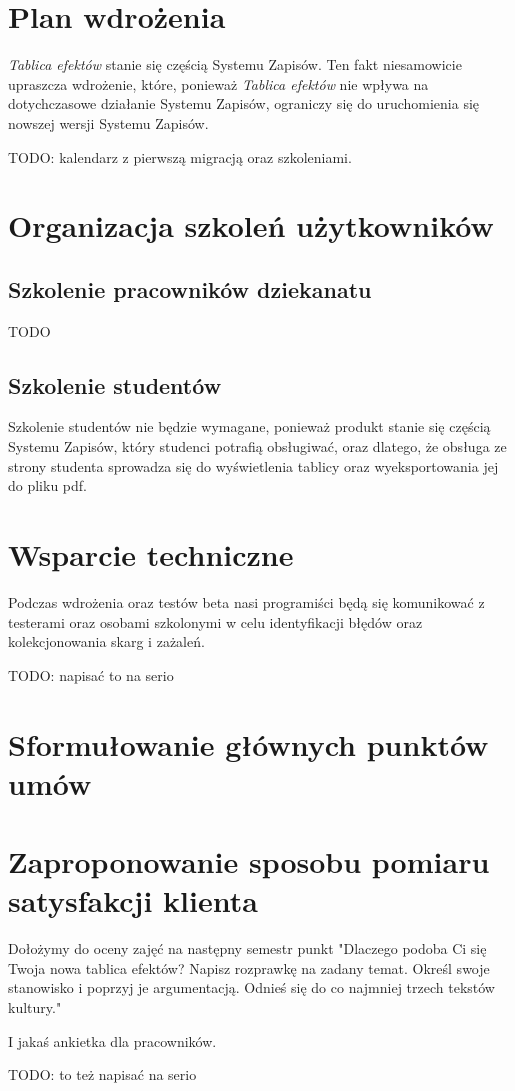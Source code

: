 \documentclass{article}
\begin{document}
\section{Plan wdrożenia}
\textit{Tablica efektów} stanie się częścią Systemu Zapisów.
Ten fakt niesamowicie upraszcza wdrożenie, które, ponieważ \textit{Tablica efektów} nie wpływa na dotychczasowe działanie Systemu Zapisów, ograniczy się do uruchomienia się nowszej wersji Systemu Zapisów.

TODO: kalendarz z pierwszą migracją oraz szkoleniami.

\section{Organizacja szkoleń użytkowników}

\subsection{Szkolenie pracowników dziekanatu}
TODO

\subsection{Szkolenie studentów}
Szkolenie studentów nie będzie wymagane, ponieważ produkt stanie się częścią Systemu Zapisów, który studenci potrafią obsługiwać, oraz dlatego, że obsługa ze strony studenta sprowadza się do wyświetlenia tablicy oraz wyeksportowania jej do pliku pdf.

\section{Wsparcie techniczne}
Podczas wdrożenia oraz testów beta nasi programiści będą się komunikować z testerami oraz osobami szkolonymi w celu identyfikacji błędów oraz kolekcjonowania skarg i zażaleń.

TODO: napisać to na serio

\section{Sformułowanie głównych punktów umów}

\section{Zaproponowanie sposobu pomiaru satysfakcji klienta}
Dołożymy do oceny zajęć na następny semestr punkt "Dlaczego podoba Ci się Twoja nowa tablica efektów? Napisz rozprawkę na zadany temat. Określ swoje stanowisko i poprzyj je argumentacją. Odnieś się do co najmniej trzech tekstów kultury."

I jakaś ankietka dla pracowników.

TODO: to też napisać na serio
\end{document}
